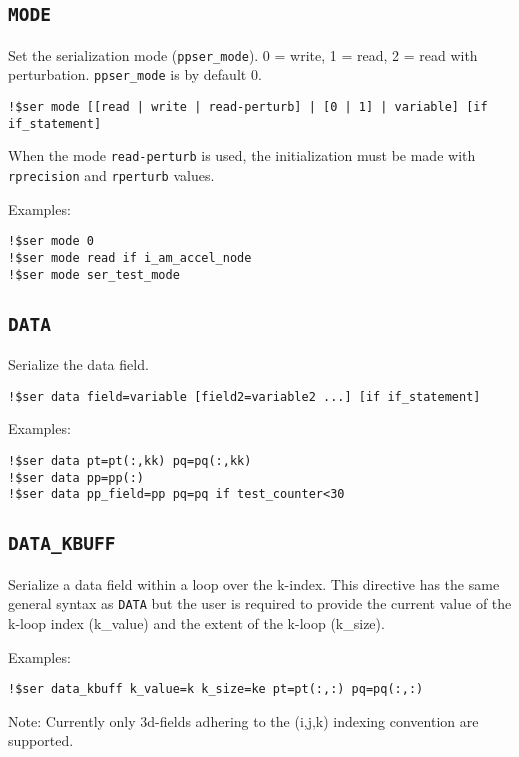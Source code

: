 \documentclass{article}
\begin{document}
\subsection{\texttt{MODE}}
Set the serialization mode (\texttt{ppser\_mode}). 0 = write, 1 = read, 2 = read with perturbation. \texttt{ppser\_mode} is by default 0.

\begin{lstlisting}
!$ser mode [[read | write | read-perturb] | [0 | 1] | variable] [if if_statement]
\end{lstlisting}

When the mode \lstinline!read-perturb! is used, the initialization must be made with \lstinline!rprecision! and \lstinline!rperturb! values.

Examples:
\begin{lstlisting}
!$ser mode 0
!$ser mode read if i_am_accel_node
!$ser mode ser_test_mode
\end{lstlisting}

\subsection{\texttt{DATA}}
Serialize the data field.

\begin{lstlisting}
!$ser data field=variable [field2=variable2 ...] [if if_statement]
\end{lstlisting}

Examples:
\begin{lstlisting}
!$ser data pt=pt(:,kk) pq=pq(:,kk)
!$ser data pp=pp(:) 
!$ser data pp_field=pp pq=pq if test_counter<30
\end{lstlisting}

\subsection{\texttt{DATA\_KBUFF}}
Serialize a data field within a loop over the k-index. This directive has the same general syntax as \texttt{DATA} but the user is required to provide the current value of the k-loop index (k\_value) and the extent of the k-loop (k\_size).

Examples:
\begin{lstlisting}
!$ser data_kbuff k_value=k k_size=ke pt=pt(:,:) pq=pq(:,:)
\end{lstlisting}

Note: Currently only 3d-fields adhering to the (i,j,k) indexing convention are supported.
\end{document}
